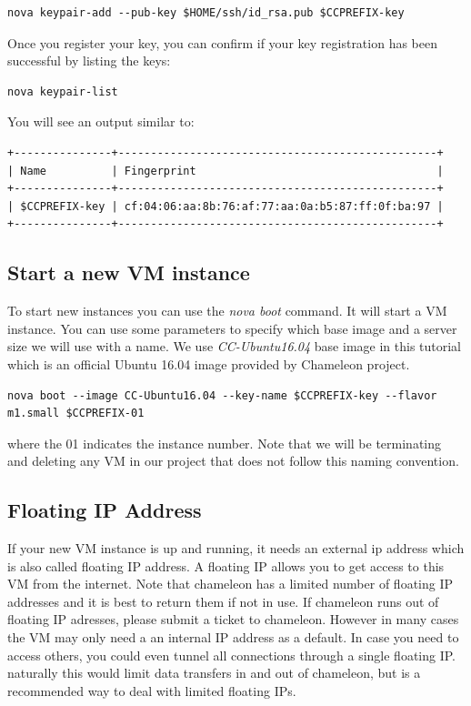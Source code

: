 \begin{lstlisting}
nova keypair-add --pub-key $HOME/ssh/id_rsa.pub $CCPREFIX-key
\end{lstlisting}

Once you register your key, you can confirm if your key registration
has been successful by listing the keys:

\begin{lstlisting}
nova keypair-list
\end{lstlisting}

You will see an output similar to:

\begin{lstlisting}
+---------------+-------------------------------------------------+
| Name          | Fingerprint                                     |
+---------------+-------------------------------------------------+
| $CCPREFIX-key | cf:04:06:aa:8b:76:af:77:aa:0a:b5:87:ff:0f:ba:97 |
+---------------+-------------------------------------------------+
\end{lstlisting}


\subsection{Start a new VM instance}

To start new instances you can use the \textit{nova boot} command. It
will start a VM instance. You can use some parameters to specify which
base image and a server size we will use with a name. We use
\textit{CC-Ubuntu16.04} base image in this tutorial which is an
official Ubuntu 16.04 image provided by Chameleon project.

\begin{lstlisting}
nova boot --image CC-Ubuntu16.04 --key-name $CCPREFIX-key --flavor m1.small $CCPREFIX-01
\end{lstlisting}

where the 01 indicates the instance number. Note that we will be
terminating and deleting any VM in our project that does not follow
this naming convention.

\subsection{Floating IP Address}

If your new VM instance is up and running, it needs an external ip
address which is also called floating IP address. A floating IP allows
you to get access to this VM from the internet. Note that chameleon
has a limited number of floating IP addresses and it is best to return
them if not in use. If chameleon runs out of floating IP adresses,
please submit a ticket to chameleon. However in many cases the VM may
only need a an internal IP address as a default. In case you need to
access others, you could even tunnel all connections through a single
floating IP. naturally this would limit data transfers in and out of
chameleon, but is a recommended way to deal with limited floating IPs.

